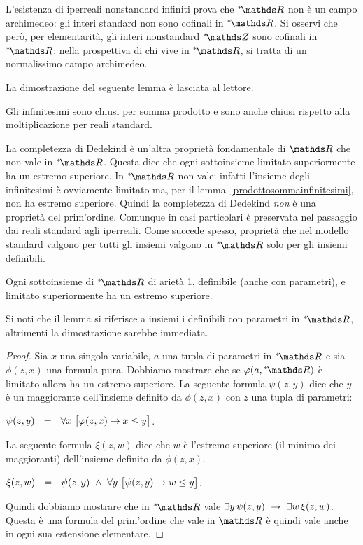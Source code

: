 L'esistenza di iperreali nonstandard infiniti prova che $\nsR$ non \`e un campo archimedeo: gli interi standard non sono cofinali in $\nsR$. Si osservi che per\`o, per elementarit\`a, gli interi nonstandard $\ns\ZZ$ sono cofinali in $\nsR$: nella prospettiva di chi vive in $\nsR$, si tratta di un normalissimo campo archimedeo. 

La dimostrazione del seguente lemma \`e lasciata al lettore.

\begin{lemma}\label{prodottosommainfinitesimi}
Gli infinitesimi sono chiusi per somma prodotto e sono anche chiusi rispetto alla moltiplicazione per reali standard.
\end{lemma}

La completezza di Dedekind \`e un'altra propriet\`a fondamentale di $\RR$ che non vale in $\nsR$. Questa dice che ogni sottoinsieme limitato superiormente ha un estremo superiore. In $\nsR$ non vale: infatti l'insieme degli infinitesimi \`e ovviamente limitato ma, per il lemma~\ref{prodottosommainfinitesimi}, non ha estremo superiore. Quindi la completezza di Dedekind \textit{non\/} \`e una propriet\`a del prim'ordine. Comunque in casi particolari \`e preservata nel passaggio dai reali standard agli iperreali. Come succede spesso, propriet\`a che nel modello standard valgono per tutti gli insiemi valgono in $\nsR$ solo per gli insiemi definibili.
 
\begin{lemma}\label{dedekindcomplete}
Ogni sottoinsieme di $\nsR$ di ariet\`a 1, definibile (anche con parametri), e limitato superiormente ha un estremo superiore.
\end{lemma}

Si noti che il lemma si riferisce a insiemi i definibili con parametri in $\nsR$, altrimenti la dimostrazione sarebbe immediata.

\begin{proof}  Sia $x$ una singola variabile, $a$ una tupla di parametri in $\nsR$ e sia $\phi(z,x)$ una formula pura. Dobbiamo mostrare che se $\phi(a,\nsR)$ \`e limitato allora ha un estremo superiore. La seguente formula $\psi(z,y)$ dice che $y$ \`e un maggiorante dell'insieme definito da $\phi(z,x)$ con $z$ una tupla di parametri:

\hfil $\psi(z,y)\ \ =\ \  \A x\ \big[\phi(z,x)\imp x\le y\big]$.

La seguente formula $\xi(z,w)$ dice che $w$ \`e l'estremo superiore (il minimo dei maggioranti) dell'insieme definito da $\phi(z,x)$. 

\hfil $\xi(z,w)\ \ =\ \  \psi(z,y)\ \wedge\ \A y\ \big[\psi(z,y)\imp w\le y\big]$.

Quindi dobbiamo mostrare che in $\nsR$ vale $\exists y\,\psi(z,y)\ \rightarrow\ \exists w\,\xi(z,w)$. Questa \`e una formula del prim'ordine che vale in $\RR$ \`e quindi vale anche in ogni sua estensione elementare.
\end{proof}

